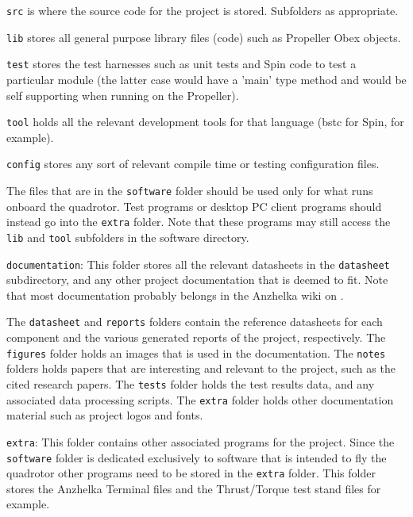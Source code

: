 \documentclass{article}
\numberwithin{equation}{section} %
\begin{document}
\begin{list}{*}{}
	\item \texttt{src} is where the source code for the project is stored. Subfolders as appropriate. 
	\item \texttt{lib} stores all general purpose library files (code) such as Propeller Obex objects. 
	\item \texttt{test} stores the test harnesses such as unit tests and Spin code to test a particular module (the latter case would have a 'main' type method and would be self supporting when running on the Propeller). 
	\item \texttt{tool} holds all the relevant development tools for that language (bstc for Spin, for example). 
	\item \texttt{config} stores any sort of relevant compile time or testing configuration files. 
\end{list}
The files that are in the \texttt{software} folder should be used only for what runs onboard the quadrotor. Test programs or desktop PC client programs should instead go into the \texttt{extra} folder. Note that these programs may still access the \texttt{lib} and \texttt{tool} subfolders in the software directory. 

\texttt{documentation}:
This folder stores all the relevant datasheets in the \texttt{datasheet} subdirectory, and any other project documentation that is deemed to fit. Note that most documentation probably belongs in the Anzhelka wiki on \cite{anzhelka_code}. 

The \texttt{datasheet} and \texttt{reports} folders contain the reference datasheets for each component and the various generated reports of the project, respectively. The \texttt{figures} folder holds an images that is used in the documentation. The \texttt{notes} folders holds papers that are interesting and relevant to the project, such as the cited research papers. The \texttt{tests} folder holds the test results data, and any associated data processing scripts. The \texttt{extra} folder holds other documentation material such as project logos and fonts. 

\texttt{extra}:
This folder contains other associated programs for the project. Since the \texttt{software} folder is dedicated exclusively to software that is intended to fly the quadrotor other programs need to be stored in the \texttt{extra} folder. This folder stores the Anzhelka Terminal files and the Thrust/Torque test stand files for example.
\end{document}
